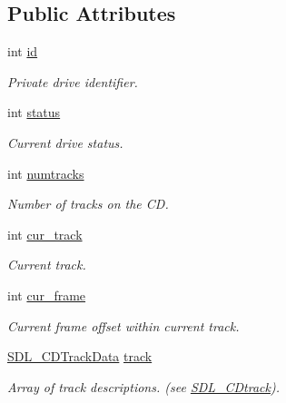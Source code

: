 \subsection*{Public Attributes}
\begin{DoxyCompactItemize}
\item 
int \hyperlink{class_tao_1_1_sdl_1_1_sdl_1_1_s_d_l___c_d_aa67216f022e18c25481dadfa918c3b0d}{id}
\begin{DoxyCompactList}\small\item\em Private drive identifier. \item\end{DoxyCompactList}\item 
int \hyperlink{class_tao_1_1_sdl_1_1_sdl_1_1_s_d_l___c_d_a5c6afca95e5c23b41664b17434ea6f28}{status}
\begin{DoxyCompactList}\small\item\em Current drive status. \item\end{DoxyCompactList}\item 
int \hyperlink{class_tao_1_1_sdl_1_1_sdl_1_1_s_d_l___c_d_ae41951995f9e509c8a85316aec65696b}{numtracks}
\begin{DoxyCompactList}\small\item\em Number of tracks on the CD. \item\end{DoxyCompactList}\item 
int \hyperlink{class_tao_1_1_sdl_1_1_sdl_1_1_s_d_l___c_d_a21e657e809122dcd17a4c3d1104c5cef}{cur\_\-track}
\begin{DoxyCompactList}\small\item\em Current track. \item\end{DoxyCompactList}\item 
int \hyperlink{class_tao_1_1_sdl_1_1_sdl_1_1_s_d_l___c_d_a316ed7c6cd0e34e361ee549b70f08b69}{cur\_\-frame}
\begin{DoxyCompactList}\small\item\em Current frame offset within current track. \item\end{DoxyCompactList}\item 
\hyperlink{class_tao_1_1_sdl_1_1_sdl_1_1_s_d_l___c_d_track_data}{SDL\_\-CDTrackData} \hyperlink{class_tao_1_1_sdl_1_1_sdl_1_1_s_d_l___c_d_abdd4b66871d91cbb568bc907ffcb3107}{track}
\begin{DoxyCompactList}\small\item\em Array of track descriptions. (see \hyperlink{struct_tao_1_1_sdl_1_1_sdl_1_1_s_d_l___c_dtrack}{SDL\_\-CDtrack}). \item\end{DoxyCompactList}\end{DoxyCompactItemize}


